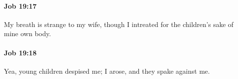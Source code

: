 		\paragraph{Job 19:17} %
			\label{JOB-19-17}

			My breath is strange to my wife, though I intreated for the children’s sake of mine own body.


		\paragraph{Job 19:18} %
			\label{JOB-19-18}

			Yea, young children despised me; I arose, and they spake against me.


